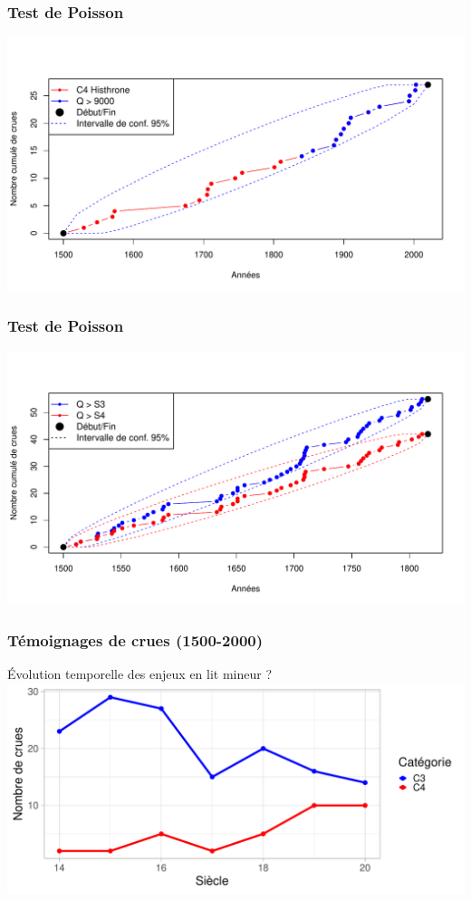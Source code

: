 \documentclass[compress,9pt]{beamer}
\begin{document}
    	\begin{frame}
    		\frametitle{Test de Poisson}
    		\centering
    		\includegraphics[width = .9\textwidth]{./Figures/Poisson_C4_recent.pdf} 	
    	\end{frame}
    	   	
    	\begin{frame}
    		\frametitle{Test de Poisson}
    		\centering
    		\includegraphics[width = .9\textwidth]{./Figures/Poisson_C3-C4_FR.pdf} 	
    	\end{frame}
    	
    	\begin{frame}
		\frametitle{Témoignages de crues (1500-2000)}
		\centering 
		\vfill
		Évolution temporelle des enjeux en lit mineur ? 
		\vfill
		\includegraphics[width = .8\textwidth]{./Figures/Nb_C3-C4.pdf}
	\end{frame}
	
\end{document}
